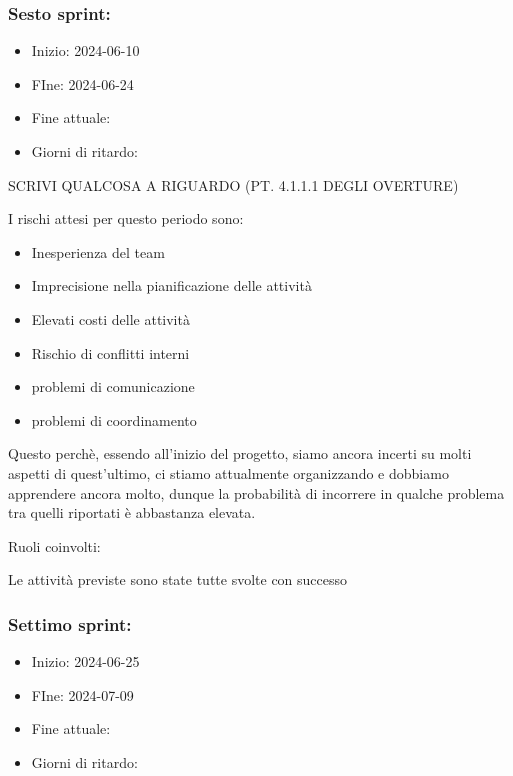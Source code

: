 

\subsubsection{Sesto sprint:}
\begin{itemize}
    \item Inizio: 2024-06-10
    \item FIne: 2024-06-24
    \item Fine attuale:
    \item Giorni di ritardo:
\end{itemize}

SCRIVI QUALCOSA A RIGUARDO (PT. 4.1.1.1 DEGLI OVERTURE)

I rischi attesi per questo periodo sono:
\begin{itemize}
    \item Inesperienza del team
    \item Imprecisione nella pianificazione delle attività
    \item Elevati costi delle attività
    \item Rischio di conflitti interni 
    \item problemi di comunicazione
    \item problemi di coordinamento
\end{itemize}
Questo perchè, essendo all’inizio del progetto, siamo ancora incerti su molti aspetti di quest’ultimo, ci stiamo attualmente organizzando e dobbiamo apprendere ancora molto, dunque la probabilità di incorrere in qualche problema tra quelli riportati è abbastanza elevata.

Ruoli coinvolti:

Le attività previste sono state tutte svolte con successo





\subsubsection{Settimo sprint:}
\begin{itemize}
    \item Inizio: 2024-06-25
    \item FIne: 2024-07-09
    \item Fine attuale:
    \item Giorni di ritardo:
\end{itemize}

